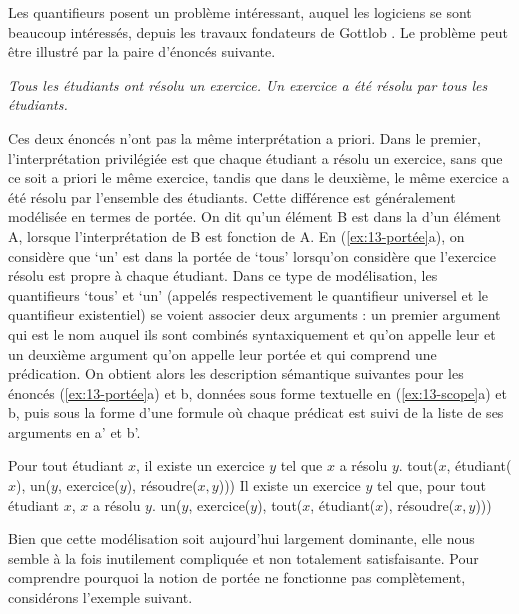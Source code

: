 {Les quantifieurs posent un problème intéressant, auquel les logiciens se sont beaucoup intéressés, depuis les travaux fondateurs de Gottlob \citet{frege1892uber}. Le problème peut être illustré par la paire d’énoncés suivante.

\ea\label{ex:13-portée}
\ea \textit{Tous les étudiants ont résolu un exercice.}
\ex \textit{Un exercice a été résolu par tous les étudiants.}\z\z

Ces deux énoncés n’ont pas la même interprétation a priori. Dans le premier, l’interprétation privilégiée est que chaque étudiant a résolu un exercice, sans que ce soit a priori le même exercice, tandis que dans le deuxième, le même exercice a été résolu par l’ensemble des étudiants. Cette différence est généralement modélisée en termes de portée. On dit qu’un élément B est dans la  d’un élément A, lorsque l’interprétation de B est fonction de A. En (\ref{ex:13-portée}a), on considère que ‘un’ est dans la portée de ‘tous’ lorsqu’on considère que l’exercice résolu est propre à chaque étudiant. Dans ce type de modélisation, les quantifieurs ‘tous’ et ‘un’ (appelés respectivement le quantifieur universel et le quantifieur existentiel) se voient associer deux arguments : un premier argument qui est le nom auquel ils sont combinés syntaxiquement et qu’on appelle leur  et un deuxième argument qu’on appelle leur portée et qui comprend une prédication. On obtient alors les description sémantique suivantes pour les énoncés (\ref{ex:13-portée}a) et b, données sous forme textuelle en (\ref{ex:13-scope}a) et b, puis sous la forme d’une formule où chaque prédicat est suivi de la liste de ses arguments en a’ et b’.


\begin{exe}\label{ex:13-scope}
    \ex
	\begin{xlist}[b'.]
		 Pour tout étudiant $x$, il existe un exercice $y$ tel que $x$ a résolu $y$.
		 tout($x$, étudiant($x$), un($y$, exercice($y$), résoudre($x,y$)))
		 Il existe un exercice $y$ tel que, pour tout étudiant $x$, $x$ a résolu $y$.
		 un($y$, exercice($y$), tout($x$, étudiant($x$), résoudre($x,y$)))
	\end{xlist}	
\end{exe}

Bien que cette modélisation soit aujourd’hui largement dominante, elle nous semble à la fois inutilement compliquée et non totalement satisfaisante. Pour comprendre pourquoi la notion de portée ne fonctionne pas complètement, considérons l’exemple suivant.

}
